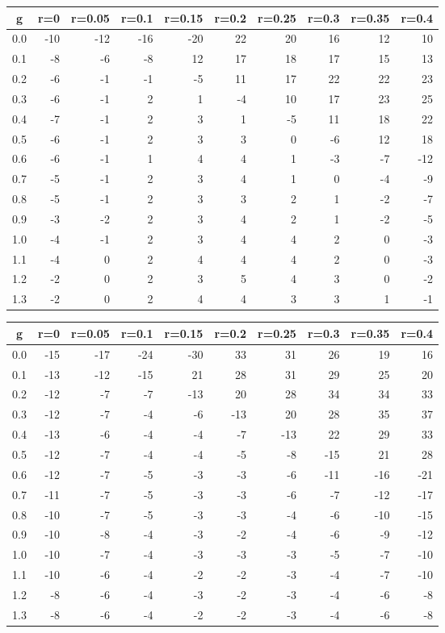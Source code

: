 %
\begin{table}[!tbp]
 \begin{center}
 \begin{tabular}{rrrrrrrrrr}\hline\hline
\multicolumn{1}{c}{g}&\multicolumn{1}{c}{r=0}&\multicolumn{1}{c}{r=0.05}&\multicolumn{1}{c}{r=0.1}&\multicolumn{1}{c}{r=0.15}&\multicolumn{1}{c}{r=0.2}&\multicolumn{1}{c}{r=0.25}&\multicolumn{1}{c}{r=0.3}&\multicolumn{1}{c}{r=0.35}&\multicolumn{1}{c}{r=0.4}\tabularnewline
\hline
0.0&-10&-12&-16&-20&22&20&16&12& 10\tabularnewline
0.1& -8& -6& -8& 12&17&18&17&15& 13\tabularnewline
0.2& -6& -1& -1& -5&11&17&22&22& 23\tabularnewline
0.3& -6& -1&  2&  1&-4&10&17&23& 25\tabularnewline
0.4& -7& -1&  2&  3& 1&-5&11&18& 22\tabularnewline
0.5& -6& -1&  2&  3& 3& 0&-6&12& 18\tabularnewline
0.6& -6& -1&  1&  4& 4& 1&-3&-7&-12\tabularnewline
0.7& -5& -1&  2&  3& 4& 1& 0&-4& -9\tabularnewline
0.8& -5& -1&  2&  3& 3& 2& 1&-2& -7\tabularnewline
0.9& -3& -2&  2&  3& 4& 2& 1&-2& -5\tabularnewline
1.0& -4& -1&  2&  3& 4& 4& 2& 0& -3\tabularnewline
1.1& -4&  0&  2&  4& 4& 4& 2& 0& -3\tabularnewline
1.2& -2&  0&  2&  3& 5& 4& 3& 0& -2\tabularnewline
1.3& -2&  0&  2&  4& 4& 3& 3& 1& -1\tabularnewline
\hline
\end{tabular}

\end{center}

\end{table}

%
\begin{table}[!tbp]
 \begin{center}
 \begin{tabular}{rrrrrrrrrr}\hline\hline
\multicolumn{1}{c}{g}&\multicolumn{1}{c}{r=0}&\multicolumn{1}{c}{r=0.05}&\multicolumn{1}{c}{r=0.1}&\multicolumn{1}{c}{r=0.15}&\multicolumn{1}{c}{r=0.2}&\multicolumn{1}{c}{r=0.25}&\multicolumn{1}{c}{r=0.3}&\multicolumn{1}{c}{r=0.35}&\multicolumn{1}{c}{r=0.4}\tabularnewline
\hline
0.0&-15&-17&-24&-30& 33& 31& 26& 19& 16\tabularnewline
0.1&-13&-12&-15& 21& 28& 31& 29& 25& 20\tabularnewline
0.2&-12& -7& -7&-13& 20& 28& 34& 34& 33\tabularnewline
0.3&-12& -7& -4& -6&-13& 20& 28& 35& 37\tabularnewline
0.4&-13& -6& -4& -4& -7&-13& 22& 29& 33\tabularnewline
0.5&-12& -7& -4& -4& -5& -8&-15& 21& 28\tabularnewline
0.6&-12& -7& -5& -3& -3& -6&-11&-16&-21\tabularnewline
0.7&-11& -7& -5& -3& -3& -6& -7&-12&-17\tabularnewline
0.8&-10& -7& -5& -3& -3& -4& -6&-10&-15\tabularnewline
0.9&-10& -8& -4& -3& -2& -4& -6& -9&-12\tabularnewline
1.0&-10& -7& -4& -3& -3& -3& -5& -7&-10\tabularnewline
1.1&-10& -6& -4& -2& -2& -3& -4& -7&-10\tabularnewline
1.2& -8& -6& -4& -3& -2& -3& -4& -6& -8\tabularnewline
1.3& -8& -6& -4& -2& -2& -3& -4& -6& -8\tabularnewline
\hline
\end{tabular}

\end{center}

\end{table}

